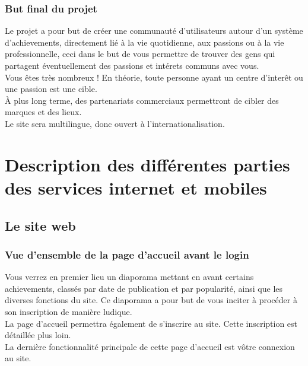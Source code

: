 \documentclass{life-fr}
\begin{document}
\subsection{But final du projet}

Le projet a pour but de créer une communauté d'utilisateurs autour d'un système d'achievements, directement lié à la vie quotidienne, aux passions ou à la vie professionnelle, ceci dans le but de vous permettre de trouver des gens qui partagent éventuellement des passions et intérets communs avec vous.\\

Vous êtes très nombreux ! En théorie, toute personne ayant un centre d'interêt ou une passion est une cible.\\

À plus long terme, des partenariats commerciaux permettront de cibler des marques et des lieux.\\

Le site sera multilingue, donc ouvert à l'internationalisation.


\chapter{Description des différentes parties des services internet et mobiles}

\section{Le site web}

\subsection{Vue d'ensemble de la page d'accueil avant le login}

Vous verrez en premier lieu un diaporama mettant en avant certains achievements, classés par date de publication et par popularité, ainsi que les diverses fonctions du site. Ce diaporama a pour but de vous inciter à procéder à son inscription de manière ludique.\\

La page d'accueil permettra également de s'inscrire au site. Cette inscription est détaillée plus loin.\\

La dernière fonctionnalité principale de cette page d'accueil est vôtre connexion au site.\\
\end{document}
